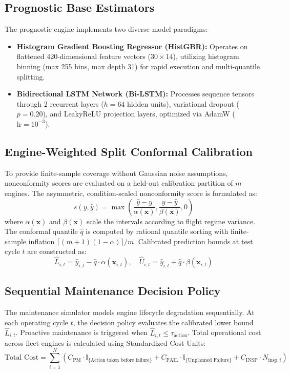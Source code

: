 \documentclass[12pt,a4paper]{article}
\begin{document}
\subsection{Prognostic Base Estimators}
The prognostic engine implements two diverse model paradigms:
\begin{itemize}[leftmargin=1.5em]
    \item \textbf{Histogram Gradient Boosting Regressor (HistGBR):} Operates on flattened 420-dimensional feature vectors ($30 \times 14$), utilizing histogram binning (max 255 bins, max depth 31) for rapid execution and multi-quantile splitting.
    \item \textbf{Bidirectional LSTM Network (Bi-LSTM):} Processes sequence tensors through 2 recurrent layers ($h=64$ hidden units), variational dropout ($p=0.20$), and LeakyReLU projection layers, optimized via AdamW ($\text{lr}=10^{-3}$).
\end{itemize}

\subsection{Engine-Weighted Split Conformal Calibration}
To provide finite-sample coverage without Gaussian noise assumptions, nonconformity scores are evaluated on a held-out calibration partition of $m$ engines. The asymmetric, condition-scaled nonconformity score is formulated as:
\begin{equation}
    s(y, \hat{y}) = \max\left( \frac{\hat{y} - y}{\alpha(\mathbf{x})}, \frac{y - \hat{y}}{\beta(\mathbf{x})}, 0 \right)
\end{equation}
where $\alpha(\mathbf{x})$ and $\beta(\mathbf{x})$ scale the intervals according to flight regime variance. The conformal quantile $\hat{q}$ is computed by rational quantile sorting with finite-sample inflation $\lceil (m+1)(1-\alpha) \rceil / m$. Calibrated prediction bounds at test cycle $t$ are constructed as:
\begin{equation}
    \hat{L}_{i,t} = \hat{y}_{i,t} - \hat{q} \cdot \alpha(\mathbf{x}_{i,t}), \quad \hat{U}_{i,t} = \hat{y}_{i,t} + \hat{q} \cdot \beta(\mathbf{x}_{i,t})
\end{equation}

\subsection{Sequential Maintenance Decision Policy}
The maintenance simulator models engine lifecycle degradation sequentially. At each operating cycle $t$, the decision policy evaluates the calibrated lower bound $\hat{L}_{i,t}$. Proactive maintenance is triggered when $\hat{L}_{i,t} \le \tau_{\text{action}}$. Total operational cost across fleet engines is calculated using Standardized Cost Units:
\begin{equation}
    \text{Total Cost} = \sum_{i=1}^{N} \left( C_{\text{PM}} \cdot \mathbb{I}_{\{\text{Action taken before failure}\}} + C_{\text{FAIL}} \cdot \mathbb{I}_{\{\text{Unplanned Failure}\}} + C_{\text{INSP}} \cdot N_{\text{insp}, i} \right)
\end{equation}
\end{document}
